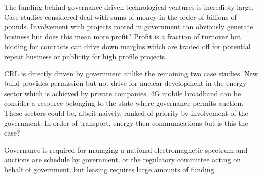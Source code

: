 {}

The funding behind governance driven technological ventures is incredibly large.
Case studies considered deal with sums of money in the order of billions of pounds.
Involvement with projects rooted in government can obviously generate business but does this mean more profit?
Profit is a fraction of turnover but bidding for contracts can drive down margins which are traded off for potential repeat business or publicity for high profile projects.  

CRL is directly driven by government unlike the remaining two case studies.
New build provides permission but not drive for nuclear development in the energy sector which is achieved by private companies.
4G mobile broadband can be consider a resource belonging to the state where governance permits auction.
These sectors could be, albeit naively, ranked of priority by involvement of the government.
In order of transport, energy then communications but is this the case?

Governance is required for managing a national electromagnetic spectrum and auctions are schedule by government, or the regulatory committee acting on behalf of government, but leasing requires large amounts of funding.



